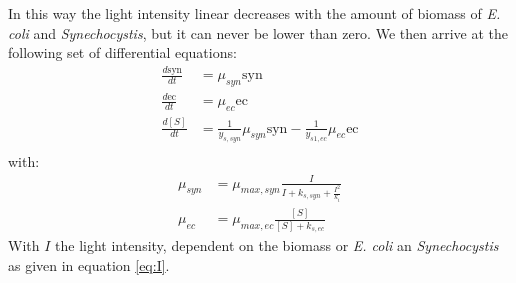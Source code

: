 \documentclass[10pt]{report}
\begin{document}
In this way the light intensity linear decreases with the amount of biomass of \textit{E. coli} and \textit{Synechocystis}, but it can never be lower than zero.
We then arrive at the following set of differential equations:
\begin{align}
 \frac{d\text{syn}}{dt} &= \mu_{syn} \text{syn} \\
 \frac{d\text{ec}}{dt} &= \mu_{ec} \text{ec} \\
 \frac{d[S]}{dt} &= \frac{1}{y_{s,syn}} \mu_{syn} \text{syn} - \frac{1}{y_{s1,ec}} \mu_{ec} \text{ec} \\
\end{align}
with:
\begin{align}
 \mu_{syn} &= \mu_{max,syn} \frac{I}{I+k_{s,syn}+\frac{I^2}{k_{i}}}\\
 \mu_{ec} &= \mu_{max,ec} \frac{[S]}{[S]+k_{s,ec}}
 \end{align}
With $I$ the light intensity, dependent on the biomass or \textit{E. coli} an \textit{Synechocystis} as given in equation \ref{eq:I}.
\end{document}
